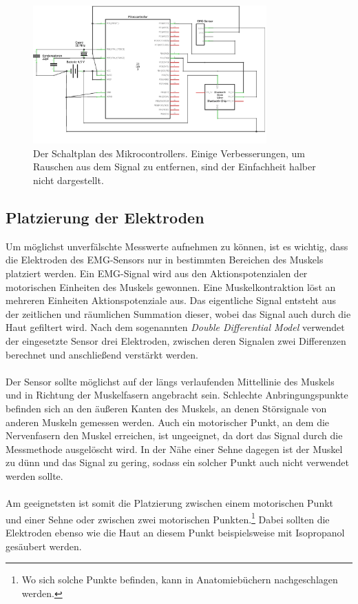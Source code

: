 \begin{figure}[H]
\centering
\includegraphics[width=0.8\textwidth]{pics/mikrocontroller_schaltplan.png}
\caption{Der Schaltplan des Mikrocontrollers. Einige Verbesserungen, um Rauschen aus dem Signal zu entfernen, sind der Einfachheit halber nicht dargestellt.}
\label{fig:mikrocontroller}
\end{figure}
\subsection{Platzierung der Elektroden}
Um möglichst unverfälschte Messwerte aufnehmen zu können, ist es wichtig, dass die Elektroden des EMG-Sensors nur in bestimmten Bereichen des Muskels platziert werden. Ein EMG-Signal wird aus den Aktionspotenzialen der motorischen Einheiten des Muskels gewonnen.\cite{Src:Delsys} Eine Muskelkontraktion löst an mehreren Einheiten Aktionspotenziale aus. Das eigentliche Signal entsteht aus der zeitlichen und räumlichen Summation dieser, wobei das Signal auch durch die Haut gefiltert wird.  Nach dem sogenannten \textit{Double Differential Model} verwendet der eingesetzte Sensor drei Elektroden, zwischen deren Signalen zwei Differenzen berechnet und anschließend verstärkt werden.\cite{Src:Delsys}\\ \\
Der Sensor sollte möglichst auf der längs verlaufenden Mittellinie des Muskels und in Richtung der Muskelfasern angebracht sein.\cite{Src:Myoware} Schlechte Anbringungspunkte befinden sich an den äußeren Kanten des Muskels, an denen Störsignale von anderen Muskeln gemessen werden.\cite{Src:Delsys} Auch ein motorischer Punkt, an dem die Nervenfasern den Muskel erreichen, ist ungeeignet, da dort das Signal durch die Messmethode ausgelöscht wird. In der Nähe einer Sehne dagegen ist der Muskel zu dünn und das Signal zu gering, sodass ein solcher Punkt auch nicht verwendet werden sollte.\cite{Src:Delsys} \\ \\
Am geeignetsten ist somit die Platzierung zwischen einem motorischen Punkt und einer Sehne oder zwischen zwei motorischen Punkten.\footnote{Wo sich solche Punkte befinden, kann in Anatomiebüchern nachgeschlagen werden.} Dabei sollten die Elektroden ebenso wie die Haut an diesem Punkt beispielsweise mit Isopropanol gesäubert werden.\cite{Src:Delsys}